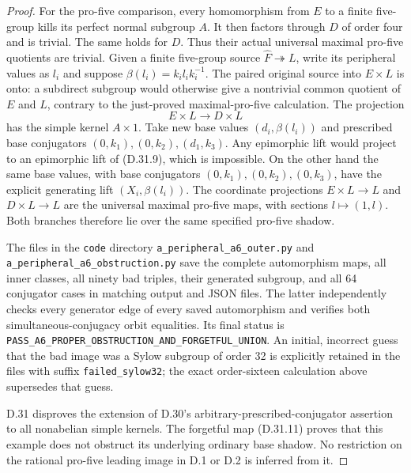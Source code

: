 \begin{proof}
For the pro-five comparison, every
homomorphism from $E$ to a finite
five-group kills its perfect normal
subgroup $A$.  It then factors
through $D$ of order four and is
trivial.  The same holds for $D$.
Thus their actual universal maximal
pro-five quotients are trivial.
Given a finite five-group source
$\widehat F\twoheadrightarrow L$,
write its peripheral values as
$l_i$ and suppose
$\beta(l_i)=k_i l_i k_i^{-1}$.
The paired original source into
$E\times L$ is onto: a subdirect
subgroup would otherwise give a
nontrivial common quotient of $E$
and $L$, contrary to the just-proved
maximal-pro-five calculation.
The projection
\[
 E\times L\longrightarrow D\times L
 \tag{D.31.12}
\]
has the simple kernel $A\times1$.
Take new base values
$(d_i,\beta(l_i))$ and prescribed
base conjugators
$(0,k_1),(0,k_2),(d_1,k_3)$.
Any epimorphic lift would project
to an epimorphic lift of
\textup{(D.31.9)}, which is impossible.
On the other hand the same base
values, with base conjugators
$(0,k_1),(0,k_2),(0,k_3)$, have the
explicit generating lift
$(X_i,\beta(l_i))$.
The coordinate projections
$E\times L\to L$ and $D\times L\to L$
are the universal maximal pro-five
maps, with sections $l\mapsto(1,l)$.
Both branches therefore lie over
the same specified pro-five shadow.

The files in the \texttt{code} directory
\texttt{a\_peripheral\_a6\_outer.py}
and \texttt{a\_peripheral\_a6\_obstruction.py}
save the complete automorphism maps,
all inner classes, all ninety bad
triples, their generated subgroup,
and all 64 conjugator cases in
matching output and JSON files.
The latter independently checks every
generator edge of every saved
automorphism and verifies both
simultaneous-conjugacy orbit equalities.
Its final status is
\texttt{PASS\_A6\_PROPER\_OBSTRUCTION\_AND\_FORGETFUL\_UNION}.
An initial, incorrect guess that the
bad image was a Sylow subgroup of
order 32 is explicitly retained in
the files with suffix
\texttt{failed\_sylow32}; the exact
order-sixteen calculation above
supersedes that guess.

D.31 disproves the extension of
D.30's arbitrary-prescribed-conjugator
assertion to all nonabelian simple
kernels.  The forgetful map
\textup{(D.31.11)} proves that this
example does not obstruct its
underlying ordinary base shadow.
No restriction on the rational
pro-five leading image in D.1 or
D.2 is inferred from it.
\end{proof}
